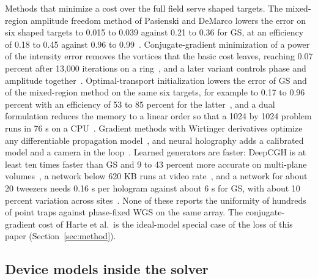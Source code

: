 Methods that minimize a cost over the full field serve shaped targets. The mixed-region amplitude freedom method of Pasienski and DeMarco lowers the error on six shaped targets to 0.015 to 0.039 against 0.21 to 0.36 for GS, at an efficiency of 0.18 to 0.45
against 0.96 to 0.99~\cite{pasienski}. Conjugate-gradient minimization of a power of the intensity error removes the vortices that the basic cost leaves, reaching 0.07 percent after 13,000 iterations on a ring~\cite{harte}, and a later variant controls phase and
amplitude together~\cite{bowman}. Optimal-transport initialization lowers the error of GS and of the mixed-region method on the same six targets, for example to 0.17 to 0.96 percent with an efficiency of 53 to 85 percent for the latter~\cite{swan}, and a dual
formulation reduces the memory to a linear order so that a 1024 by 1024 problem runs in 76 s on a CPU~\cite{torchylo}. Gradient methods with Wirtinger derivatives optimize any differentiable propagation model~\cite{chakravarthula}, and neural holography adds a calibrated
model and a camera in the loop~\cite{peng}. Learned generators are faster: DeepCGH is at least ten times faster than GS and 9 to 43 percent more accurate on multi-plane volumes~\cite{eybposh}, a network below 620 KB runs at video rate~\cite{shi}, and a network for about 20 tweezers
needs 0.16 s per hologram against about 6 s for GS, with about 10 percent variation across sites~\cite{ren}. None of these reports the uniformity of hundreds of point traps against phase-fixed WGS on the same array. The conjugate-gradient cost of Harte et al.\ is the ideal-model special case of the loss of this paper (Section~\ref{sec:method}).

\subsection{Device models inside the solver}

